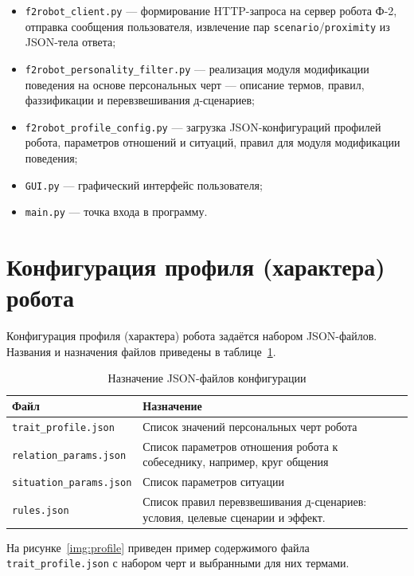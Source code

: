 \begin{itemize}
	\item \texttt{f2robot\_client.py} --- формирование HTTP-запроса на сервер робота Ф-2, отправка сообщения пользователя, извлечение пар
	\texttt{scenario}/\texttt{proximity} из JSON-тела ответа;
	\item \texttt{f2robot\_personality\_filter.py} --- реализация модуля модификации поведения на основе персональных черт --- описание термов, правил, фаззификации и перевзвешивания д-сценариев;
	\item \texttt{f2robot\_profile\_config.py} --- загрузка JSON-конфигураций профилей
	робота, параметров отношений и ситуаций, правил для
	модуля модификации поведения;
	\item \texttt{GUI.py} --- графический интерфейс пользователя;
	\item \texttt{main.py} --- точка входа в программу.
\end{itemize}

\section{Конфигурация профиля (характера) робота}

Конфигурация профиля (характера) робота задаётся набором JSON-файлов.
Названия и назначения файлов приведены в таблице~\ref{tbl:json_config_files}.

\begin{table}[H]
	\centering
	\caption{Назначение JSON-файлов конфигурации}
	\label{tbl:json_config_files}
	\begin{tabularx}{\textwidth}{|p{}|X|}
		\hline
		\textbf{Файл} & \textbf{Назначение} \\
		\hline
		\texttt{trait\_profile.json} & Список значений персональных черт робота \\
		\hline
		\texttt{relation\_params.json} & Список параметров отношения робота к собеседнику, например, круг общения \\
		\hline
		\texttt{situation\_params.json} & Список параметров ситуации \\
		\hline
		\texttt{rules.json} & Список правил перевзвешивания д-сценариев:
		условия, целевые сценарии и эффект. \\
		\hline
	\end{tabularx}
\end{table}

На рисунке~\ref{img:profile} приведен пример содержимого файла \texttt{trait\_profile.json} с набором черт и выбранными для них термами.

